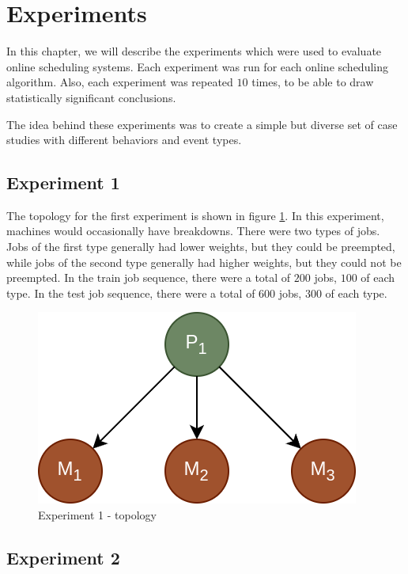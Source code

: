 \section{Experiments}
\label{sec:experiments}

In this chapter, we will describe the experiments which were used to evaluate online scheduling systems. Each experiment was run for each online scheduling algorithm. Also, each experiment was repeated $10$ times, to be able to draw statistically significant conclusions.

The idea behind these experiments was to create a simple but diverse set of case studies with different behaviors and event types.

\subsection{Experiment 1}

The topology for the first experiment is shown in figure \ref{fig:experiment1_topology}. In this experiment, machines would occasionally have breakdowns. There were two types of jobs. Jobs of the first type generally had lower weights, but they could be preempted, while jobs of the second type generally had higher weights, but they could not be preempted. In the train job sequence, there were a total of $200$ jobs, $100$ of each type. In the test job sequence, there were a total of $600$ jobs, $300$ of each type.

\begin{figure}[!htbp]
	\centering
	\includegraphics[scale=0.3]{../images/experiment1_topology.png}
	\caption{Experiment 1 - topology}
    \label{fig:experiment1_topology}
\end{figure}

\subsection{Experiment 2}

